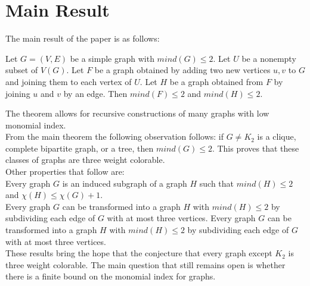 \section{Main Result}
The main result of the paper is as follows:
\begin{theorem}
	Let $G = (V, E)$ be a simple graph with $mind(G) \leq 2$. Let $U$ be a nonempty subset of $V(G)$. Let $F$ be a graph obtained by adding two new vertices $u, v$ to $G$ and joining them to each vertex of $U$. Let $H$ be a graph obtained from $F$ by joining $u$ and $v$ by an edge. Then $mind(F) \leq 2$ and $mind(H) \leq 2$.
\end{theorem}
The theorem allows for recursive constructions of many graphs with low monomial index.
\\
From the main theorem the following observation follows: if $G \neq K_2$ is a clique, complete bipartite graph, or a tree, then $mind(G) \leq 2$. This proves that these classes of graphs are three weight colorable. 
\\
Other properties that follow are: 
\\
Every graph $G$ is an induced subgraph of a graph $H$ such that $mind(H) \leq 2$ and $\chi(H) \leq \chi(G) + 1$.
\\
Every graph $G$ can be transformed into a graph $H$ with $mind(H) \leq 2$ by subdividing each edge of $G$ with at most three vertices. Every graph $G$ can be transformed into a graph $H$ with $mind(H) \leq 2$ by subdividing each edge of $G$ with at most three vertices.
\\
These results bring the hope that the conjecture that every graph except $K_2$ is three weight colorable. The main question that still remains open is whether there is a finite bound on the monomial index for graphs.